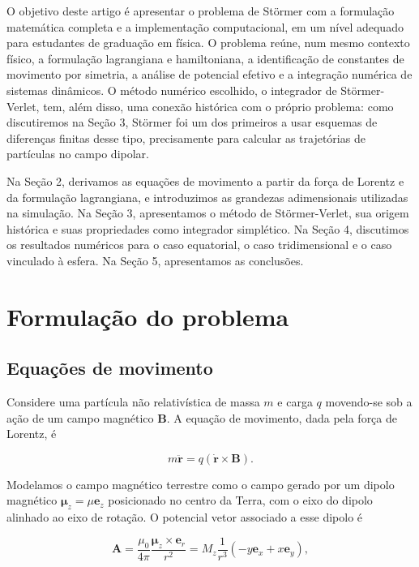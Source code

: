 \documentclass[twocolumn]{rbef}
\begin{document}
O objetivo deste artigo é apresentar o problema de Störmer com a formulação matemática completa e a implementação computacional, em um nível adequado para estudantes de graduação em física. O problema reúne, num mesmo contexto físico, a formulação lagrangiana e hamiltoniana, a identificação de constantes de movimento por simetria, a análise de potencial efetivo e a integração numérica de sistemas dinâmicos. O método numérico escolhido, o integrador de Störmer-Verlet, tem, além disso, uma conexão histórica com o próprio problema: como discutiremos na Seção 3, Störmer foi um dos primeiros a usar esquemas de diferenças finitas desse tipo, precisamente para calcular as trajetórias de partículas no campo dipolar.

Na Seção 2, derivamos as equações de movimento a partir da força de Lorentz e da formulação lagrangiana, e introduzimos as grandezas adimensionais utilizadas na simulação. Na Seção 3, apresentamos o método de Störmer-Verlet, sua origem histórica e suas propriedades como integrador simplético. Na Seção 4, discutimos os resultados numéricos para o caso equatorial, o caso tridimensional e o caso vinculado à esfera. Na Seção 5, apresentamos as conclusões.

\section{Formulação do problema}

\subsection{Equações de movimento}

Considere uma partícula não relativística de massa $m$ e carga $q$ movendo-se sob a ação de um campo magnético $\boldsymbol{B}$. A equação de movimento, dada pela força de Lorentz, é

\begin{equation}\label{lorentz}
    m\boldsymbol{\ddot{r}} = q\left(\boldsymbol{\dot{r}} \times \boldsymbol{B}\right).
\end{equation}

Modelamos o campo magnético terrestre como o campo gerado por um dipolo magnético $\boldsymbol{\mu}_z = \mu \boldsymbol{e}_z$ posicionado no centro da Terra, com o eixo do dipolo alinhado ao eixo de rotação. O potencial vetor associado a esse dipolo é

\begin{equation}\label{potencialVetor}
    \boldsymbol{A} = \dfrac{\mu_0}{4\pi}\dfrac{\boldsymbol{\mu}_z \times \boldsymbol{e}_r}{r^2} = M_z\dfrac{1}{r^3}\left(-y\boldsymbol{e}_x + x\boldsymbol{e}_y\right),
\end{equation}
\end{document}
